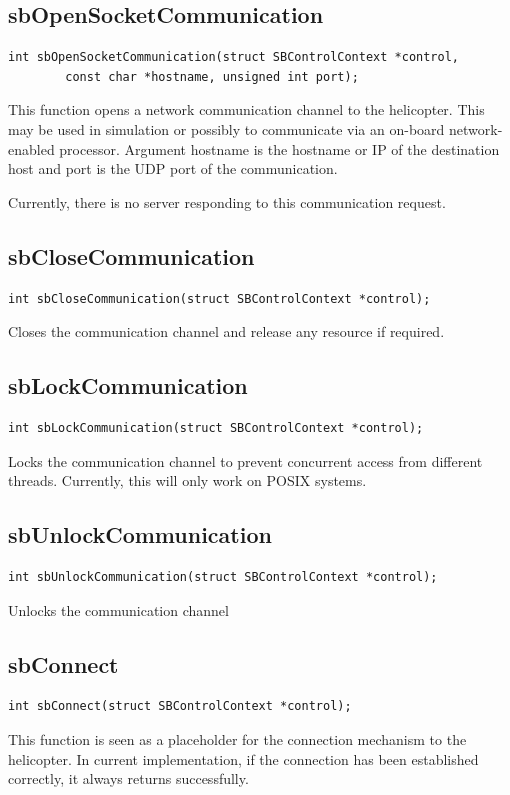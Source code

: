 \documentclass{article}
\begin{document}
\subsection{sbOpenSocketCommunication}
\label{sec:sbOpenSocketCommunication}
\begin{verbatim}
int sbOpenSocketCommunication(struct SBControlContext *control,
        const char *hostname, unsigned int port);
\end{verbatim}
This function opens a network communication channel to the helicopter.
This may be used in simulation or possibly to communicate via an on-board
network-enabled processor. Argument hostname is the hostname or IP of the
destination host and port is the UDP port of the communication.

Currently, there is no server responding to this communication request.

\subsection{sbCloseCommunication}
\label{sec:sbCloseCommunication}
\begin{verbatim}
int sbCloseCommunication(struct SBControlContext *control);
\end{verbatim}
Closes the communication channel and release any resource if required.

\subsection{sbLockCommunication}
\label{sec:sbLockCommunication}
\begin{verbatim}
int sbLockCommunication(struct SBControlContext *control);
\end{verbatim}
Locks the communication channel to prevent concurrent access from different
threads. Currently, this will only work on POSIX systems.

\subsection{sbUnlockCommunication}
\label{sec:sbUnlockCommunication}
\begin{verbatim}
int sbUnlockCommunication(struct SBControlContext *control);
\end{verbatim}
Unlocks the communication channel

\subsection{sbConnect}
\label{sec:sbConnect}
\begin{verbatim}
int sbConnect(struct SBControlContext *control);
\end{verbatim}
This function is seen as a placeholder for the connection mechanism to the
helicopter. In current implementation, if the connection has been established
correctly, it always returns successfully.
\end{document}
